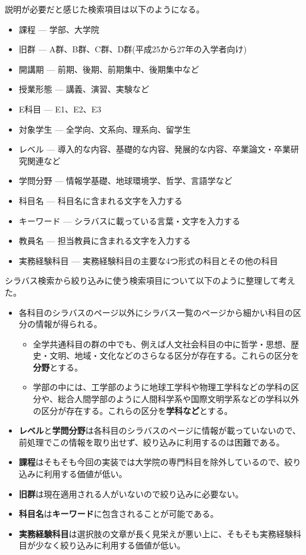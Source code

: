 説明が必要だと感じた検索項目は以下のようになる。

\begin{itemize}
  \item 課程 --- 学部、大学院
  \item 旧群 --- A群、B群、C群、D群(平成25から27年の入学者向け)
  \item 開講期 --- 前期、後期、前期集中、後期集中など
  \item 授業形態 --- 講義、演習、実験など
  \item E科目 --- E1、E2、E3
  \item 対象学生 --- 全学向、文系向、理系向、留学生
  \item レベル --- 導入的な内容、基礎的な内容、発展的な内容、卒業論文・卒業研究関連など
  \item 学問分野 --- 情報学基礎、地球環境学、哲学、言語学など
  \item 科目名 --- 科目名に含まれる文字を入力する
  \item キーワード --- シラバスに載っている言葉・文字を入力する
  \item 教員名 --- 担当教員に含まれる文字を入力する
  \item 実務経験科目 --- 実務経験科目の主要な4つ形式の科目とその他の科目
\end{itemize}

シラバス検索から絞り込みに使う検索項目について以下のように整理して考えた。

\begin{itemize}
  \item 各科目のシラバスのページ以外にシラバス一覧のページから細かい科目の区分の情報が得られる。
  \begin{itemize}
    \item 全学共通科目の群の中でも、例えば人文社会科目の中に哲学・思想、歴史・文明、地域・文化などのさらなる区分が存在する。これらの区分を\textbf{分野}とする。
    \item 学部の中には、工学部のように地球工学科や物理工学科などの学科の区分や、総合人間学部のように人間科学系や国際文明学系などの学科以外の区分が存在する。これらの区分を\textbf{学科など}とする。
  \end{itemize}
  \item \textbf{レベル}と\textbf{学問分野}は各科目のシラバスのページに情報が載っていないので、前処理でこの情報を取り出せず、絞り込みに利用するのは困難である。
  \item \textbf{課程}はそもそも今回の実装では大学院の専門科目を除外しているので、絞り込みに利用する価値が低い。
  \item \textbf{旧群}は現在適用される人がいないので絞り込みに必要ない。
  \item \textbf{科目名}は\textbf{キーワード}に包含されることが可能である。
  \item \textbf{実務経験科目}は選択肢の文章が長く見栄えが悪い上に、そもそも実務経験科目が少なく絞り込みに利用する価値が低い。
\end{itemize}

